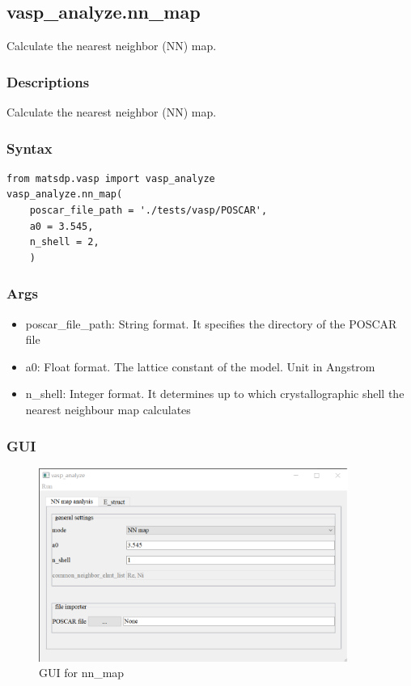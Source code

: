 \documentclass[12pt]{book}
\begin{document}
\subsection{vasp\_analyze.nn\_map}
Calculate the nearest neighbor (NN) map.

\subsubsection{Descriptions}
Calculate the nearest neighbor (NN) map.
\subsubsection{Syntax}
\begin{lstlisting}
from matsdp.vasp import vasp_analyze
vasp_analyze.nn_map(
    poscar_file_path = './tests/vasp/POSCAR',
    a0 = 3.545,
    n_shell = 2,
    )
\end{lstlisting}
\subsubsection{Args}
\begin{itemize}
\item poscar\_file\_path: String format. It specifies the directory of the POSCAR file
\item a0: Float format. The lattice constant of the model. Unit in Angstrom
\item n\_shell: Integer format. It determines up to which crystallographic shell the nearest neighbour map calculates
 \end{itemize}

\subsubsection{GUI}
\begin{figure}[htbp]
\centering
\includegraphics[width=0.9\textwidth]{gui_nn_map.pdf}
\caption{GUI for nn\_map}
\label{fig:GUI_NN_map}
\end{figure}
\end{document}
